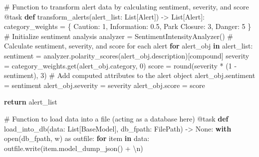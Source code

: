 \documentclass[
  letterpaper,
  DIV=11,
  numbers=noendperiod]{scrartcl}
\newenvironment{Shaded}{\begin{snugshade}}{\end{snugshade}}
\newcommand{\AttributeTok}[1]{\textcolor[rgb]{0.40,0.45,0.13}{#1}}
\newcommand{\BuiltInTok}[1]{\textcolor[rgb]{0.00,0.23,0.31}{#1}}
\newcommand{\CharTok}[1]{\textcolor[rgb]{0.13,0.47,0.30}{#1}}
\newcommand{\CommentTok}[1]{\textcolor[rgb]{0.37,0.37,0.37}{#1}}
\newcommand{\ControlFlowTok}[1]{\textcolor[rgb]{0.00,0.23,0.31}{\textbf{#1}}}
\newcommand{\DecValTok}[1]{\textcolor[rgb]{0.68,0.00,0.00}{#1}}
\newcommand{\FloatTok}[1]{\textcolor[rgb]{0.68,0.00,0.00}{#1}}
\newcommand{\ImportTok}[1]{\textcolor[rgb]{0.00,0.46,0.62}{#1}}
\newcommand{\KeywordTok}[1]{\textcolor[rgb]{0.00,0.23,0.31}{\textbf{#1}}}
\newcommand{\NormalTok}[1]{\textcolor[rgb]{0.00,0.23,0.31}{#1}}
\newcommand{\OperatorTok}[1]{\textcolor[rgb]{0.37,0.37,0.37}{#1}}
\newcommand{\StringTok}[1]{\textcolor[rgb]{0.13,0.47,0.30}{#1}}
\newcommand{\VariableTok}[1]{\textcolor[rgb]{0.07,0.07,0.07}{#1}}
\begin{document}
\begin{Shaded}
\begin{Highlighting}[]
\CommentTok{\# Function to transform alert data by calculating sentiment, severity, and score}
\AttributeTok{@task}
\KeywordTok{def}\NormalTok{ transform\_alerts(alert\_list: List[Alert]) }\OperatorTok{{-}\textgreater{}}\NormalTok{ List[Alert]:}
\NormalTok{    category\_weights }\OperatorTok{=}\NormalTok{ \{}
        \StringTok{\textquotesingle{}Caution\textquotesingle{}}\NormalTok{: }\DecValTok{1}\NormalTok{,}
        \StringTok{\textquotesingle{}Information\textquotesingle{}}\NormalTok{: }\FloatTok{0.5}\NormalTok{,}
        \StringTok{\textquotesingle{}Park Closure\textquotesingle{}}\NormalTok{: }\DecValTok{3}\NormalTok{,}
        \StringTok{\textquotesingle{}Danger\textquotesingle{}}\NormalTok{: }\DecValTok{5}
\NormalTok{    \}}
    \CommentTok{\# Initialize sentiment analysis}
\NormalTok{    analyzer }\OperatorTok{=}\NormalTok{ SentimentIntensityAnalyzer()}
    \CommentTok{\# Calculate sentiment, severity, and score for each alert}
    \ControlFlowTok{for}\NormalTok{ alert\_obj }\KeywordTok{in}\NormalTok{ alert\_list:}
\NormalTok{        sentiment }\OperatorTok{=}\NormalTok{ analyzer.polarity\_scores(alert\_obj.description)[}\StringTok{\textquotesingle{}compound\textquotesingle{}}\NormalTok{]}
\NormalTok{        severity }\OperatorTok{=}\NormalTok{ category\_weights.get(alert\_obj.category, }\DecValTok{0}\NormalTok{)}
\NormalTok{        score }\OperatorTok{=} \BuiltInTok{round}\NormalTok{(severity }\OperatorTok{*}\NormalTok{ (}\DecValTok{1} \OperatorTok{{-}}\NormalTok{ sentiment), }\DecValTok{3}\NormalTok{)}
        \CommentTok{\# Add computed attributes to the alert object}
\NormalTok{        alert\_obj.sentiment }\OperatorTok{=}\NormalTok{ sentiment}
\NormalTok{        alert\_obj.severity }\OperatorTok{=}\NormalTok{ severity}
\NormalTok{        alert\_obj.score }\OperatorTok{=}\NormalTok{ score}

    \ControlFlowTok{return}\NormalTok{ alert\_list}

\CommentTok{\# Function to load data into a file (acting as a database here)}
\AttributeTok{@task}
\KeywordTok{def}\NormalTok{ load\_into\_db(data: List[BaseModel], db\_fpath: FilePath) }\OperatorTok{{-}\textgreater{}} \VariableTok{None}\NormalTok{:}
    \ControlFlowTok{with} \BuiltInTok{open}\NormalTok{(db\_fpath, }\StringTok{\textquotesingle{}w\textquotesingle{}}\NormalTok{) }\ImportTok{as}\NormalTok{ outfile:}
        \ControlFlowTok{for}\NormalTok{ item }\KeywordTok{in}\NormalTok{ data:}
\NormalTok{            outfile.write(item.model\_dump\_json() }\OperatorTok{+} \StringTok{\textquotesingle{}}\CharTok{\textbackslash{}n}\StringTok{\textquotesingle{}}\NormalTok{)}


\end{Highlighting}
\end{Shaded}
\end{document}
